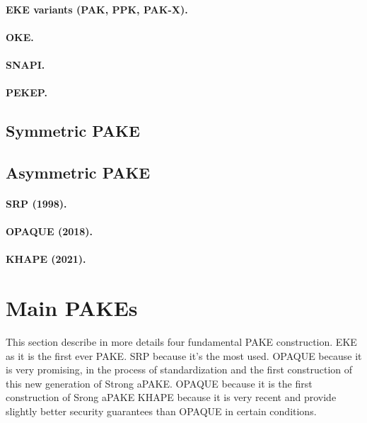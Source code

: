 \documentclass[../report.tex]{subfiles}
\begin{document}
\paragraph{EKE variants (PAK, PPK, PAK-X).}
\paragraph{OKE.}
\paragraph{SNAPI.}
\paragraph{PEKEP.}
\subsection{Symmetric PAKE}
\subsection{Asymmetric PAKE}
\paragraph{SRP (1998).}
\paragraph{OPAQUE (2018).}
\paragraph{KHAPE (2021).}




\section{Main PAKEs}

This section describe in more details four fundamental PAKE construction. 
EKE as it is the first ever PAKE. 
SRP because it's the most used. 
OPAQUE because it is very promising, in the process of standardization and the first construction of this new generation of Strong aPAKE.
OPAQUE because it is the first construction of Srong aPAKE
KHAPE because it is very recent and provide slightly better security guarantees than OPAQUE in certain conditions.


\subsection{}
\end{document}
